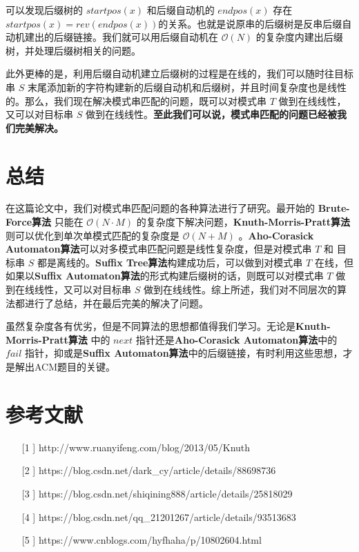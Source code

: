 \documentclass[UTF8]{ctexart}
\begin{document}
可以发现后缀树的 $startpos(x)$ 和后缀自动机的 $endpos(x)$ 存在$startpos(x)=rev(endpos(x))$的关系。也就是说原串的后缀树是反串后缀自动机建出的后缀链接。我们就可以用后缀自动机在 $\mathcal{O}(N)$ 的复杂度内建出后缀树，并处理后缀树相关的问题。\par

此外更棒的是，利用后缀自动机建立后缀树的过程是在线的，我们可以随时往目标串 $S$ 末尾添加新的字符构建新的后缀自动机和后缀树，并且时间复杂度也是线性的。那么，我们现在解决模式串匹配的问题，既可以对模式串 $T$ 做到在线线性，又可以对目标串 $S$ 做到在线线性。\textbf{至此我们可以说，模式串匹配的问题已经被我们完美解决。}

\section{总结}

在这篇论文中，我们对模式串匹配问题的各种算法进行了研究。最开始的 \textbf{Brute-Force算法} 只能在 $\mathcal{O}(N \cdot M)$ 的复杂度下解决问题，\textbf{Knuth-Morris-Pratt算法}则可以优化到单次单模式匹配的复杂度是 $\mathcal{O}(N + M)$ 。\textbf{Aho-Corasick Automaton算法}可以对多模式串匹配问题是线性复杂度，但是对模式串 $T$ 和 目标串 $S$ 都是离线的。\textbf{Suffix Tree算法}构建成功后，可以做到对模式串 $T$ 在线，但如果以\textbf{Suffix Automaton算法}的形式构建后缀树的话，则既可以对模式串 $T$ 做到在线线性，又可以对目标串 $S$ 做到在线线性。综上所述，我们对不同层次的算法都进行了总结，并在最后完美的解决了问题。 \par

虽然复杂度各有优劣，但是不同算法的思想都值得我们学习。无论是\textbf{Knuth-Morris-Pratt算法} 中的 $next$ 指针还是\textbf{Aho-Corasick Automaton算法}中的 $fail$ 指针，抑或是\textbf{Suffix Automaton算法}中的后缀链接，有时利用这些思想，才是解出ACM题目的关键。

\section{参考文献}

\begin{itemize}
 \item [[1]] 
http://www.ruanyifeng.com/blog/2013/05/Knuth%
\item [[2]] 
https://blog.csdn.net/dark\_cy/article/details/88698736
\item [[3]] 
https://blog.csdn.net/shiqining888/article/details/25818029
\item [[4]] 
https://blog.csdn.net/qq\_21201267/article/details/93513683
\item [[5]] 
https://www.cnblogs.com/hyfhaha/p/10802604.html
\end{itemize}
\end{document}
